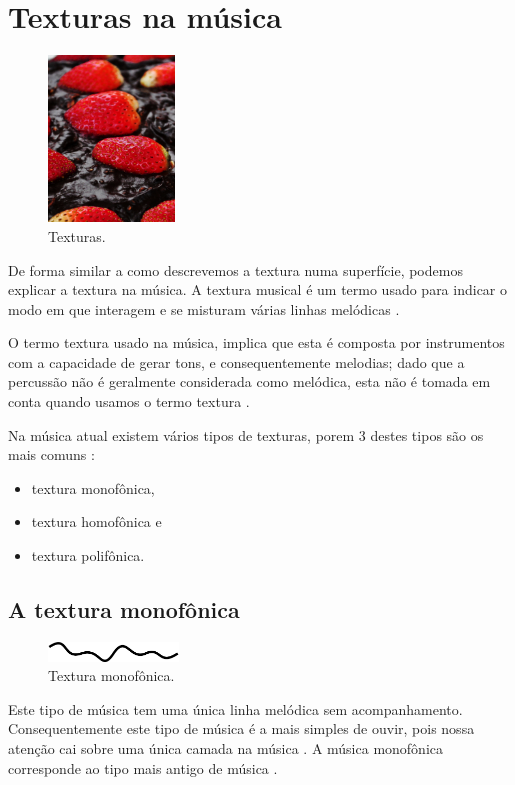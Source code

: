 \newpage

\section{Texturas na música}
\label{sec:texturasmusica}
\begin{figure}
    \centering 
    \includegraphics[width=0.30\textwidth]{chapters/cap-musicalidade-percepcion/textura.jpg}
  \caption{Texturas.}
\end{figure}
De forma similar a como descrevemos a textura numa superfície,
podemos explicar a textura na música.
A textura musical é um termo usado para indicar o modo em que interagem e 
se misturam várias linhas melódicas \cite[pp. 29]{kerman2015listen}.


O termo textura usado na música, 
implica que esta é composta por instrumentos com a capacidade de gerar tons,
e consequentemente melodias;
dado que a percussão não é geralmente considerada como melódica, 
esta não é tomada em conta quando usamos o termo textura \cite[pp. 59]{holland2013music}.

Na música atual existem  vários tipos de texturas, 
porem 3 destes tipos  são os mais comuns 
\cite[pp. 77]{copland1974ouvir} \cite[pp. 29]{kerman2015listen} \cite[pp. 322]{harnum2009basic}:
\begin{itemize}
\item textura monofônica, 
\item textura homofônica e
\item textura polifônica.
\end{itemize}

 
\subsection{A textura monofônica}
\label{subsec:monofonica}
\begin{figure}
\centering
    \includegraphics[width=0.31\textwidth]{chapters/cap-musicalidade-percepcion/monofonica1.eps}
  \caption{Textura monofônica.}
\end{figure}
Este tipo de música tem uma única linha melódica sem acompanhamento.
Consequentemente este tipo de música é a mais simples de ouvir, 
pois nossa atenção cai sobre uma única camada na música \cite[pp. 77]{copland1974ouvir} \cite[pp. 29]{kerman2015listen}.
A música monofônica corresponde ao tipo mais antigo de música \cite[pp. 539]{apel1969harvard}.

